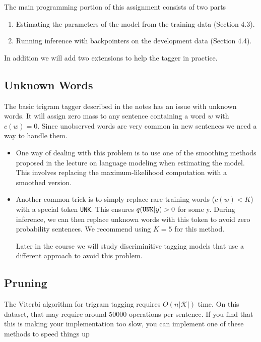\documentclass{article}
\begin{document}
The main programming portion of this assignment consists of two parts

\begin{enumerate}
\item Estimating the parameters of the model from the training data (Section 4.3).
\item Running inference with backpointers on the development data (Section 4.4).
\end{enumerate}

In addition we will add two extensions to help the tagger in practice.

\subsection{Unknown Words}

The basic trigram tagger described in the notes has an issue with unknown words. It will assign zero mass to any sentence containing a word $w$ with $c(w) = 0$. Since unobserved words are very common in new sentences we need a way to handle them.

\begin{itemize}
\item One way of dealing with this problem is to use one of the smoothing methods proposed in the lecture on language modeling when estimating the model. This involves replacing the maximum-likelihood computation with a smoothed version.

\item Another common trick is to simply replace rare training words ($c(w) < K$) with a special token \texttt{UNK}. This ensures $q(\mbox{\texttt{UNK}} | y) > 0$ for some y. During inference, we can then replace unknown words with this token to avoid zero probability sentences. We recommend using $K=5$ for this method.

Later in the course we will study discriminitive tagging models that use a different approach to avoid this problem.

\end{itemize}

\subsection{Pruning}

The Viterbi algorithm for trigram tagging requires $O(n|\mathcal{K}|)$ time. On this dataset, that may require around $50000$ operations per sentence. If you find that this is making your implementation too slow, you can implement one of these methods to speed things up
\end{document}
